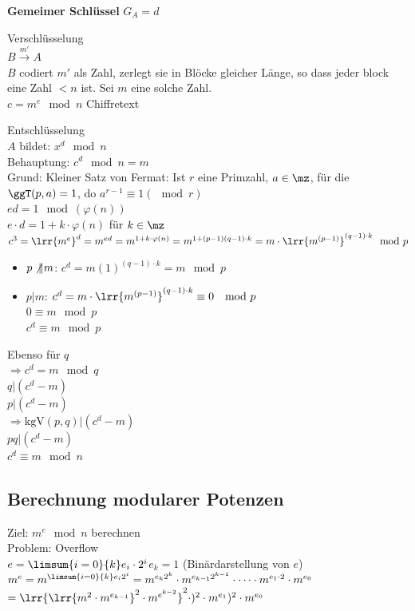 				\textbf{Gemeimer Schlüssel} $G_A=d$
			\item Verschlüsselung\\
				$B\overset{m'}{\longrightarrow} A$	\\
				$B$ codiert $m'$ als Zahl, zerlegt sie in Blöcke gleicher Länge, so dass jeder block eine Zahl $<n$ ist. Sei $m$ eine solche Zahl.\\
				$c=m^e\mod n$ Chiffretext
			\item Entschlüsselung\\
			$A$ bildet: $x^d\mod n$\\
			Behauptung: $c^d\mod n=m$\\
      Grund: Kleiner Satz von Fermat: Ist $r$ eine Primzahl, $a\in\mz$, für die
      $\ggT(p,a)=1$, do $a^{r-1}\equiv 1(\mod r)$\\
		$ed=1\mod(\varphi(n))$\\
		$e\cdot d=1+k\cdot\varphi(n)$ für $k\in\mz$\\
		$c^3=\lrr{m^e}^d=m^{ed}=m^{1+k\cdot\varphi(n)}=m^{1+(p-1)(q-1)\cdot k}=m\cdot\lrr{m^{(p-1)}}^{(q-1)\cdot k}\mod p$
		\begin{itemize}
			\item $p\not\|m$: $c^d=m(1)^{(q-1)\cdot k}=m\mod p$
			\item $p|m$: $c^d=m\cdot\lrr{m^{(p-1)}}^{(q-1)\cdot k}\equiv 0\ \mod p$\\
			$0\equiv m\mod p$\\
			$c^d\equiv m\mod p$
		\end{itemize}
		Ebenso für $q$\\
		$\Rightarrow c^d=m\mod q$\\
		$q|(c^d-m)$\\
		$p|(c^d-m)$\\
		$\Rightarrow\mbox{kgV}(p,q)|(c^d-m)$\\
		$pq|(c^d-m)$\\
		$c^d\equiv m\mod n$
		\subExEnd

	\subsection{Berechnung modularer Potenzen}
		Ziel: $m^e\mod n$ berechnen\\
		Problem: Overflow\\
		$e=\limsum{i=0}{k}e_i\cdot 2^i$\quad $e_k=1$ (Binärdarstellung von $e$)\\
		$m^e=m^{\limsum{i=0}{k}e_i2^i}=m^{e_k2^k}\cdot m^{e_{k-1}2^{k-1}}\cdot\dots\cdot m^{e_1\cdot 2}\cdot m^{e_0}$\\
		$=\lrr{\lrr{m^2\cdot m^{e_{k-1}}}^2\cdot m^{e^{k-2}}}^2\cdot)^2\cdot m^{e_1})^2\cdot m^{e_0}$

